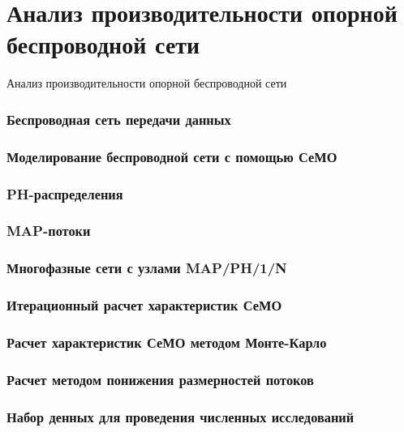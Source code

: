 \section{Анализ производительности опорной беспроводной сети}
\begin{frame}
    \begin{center}
        \Huge
        Анализ производительности опорной беспроводной сети
    \end{center}
\end{frame}

\begin{frame}
    \frametitle{Беспроводная сеть передачи данных}
\end{frame}

\begin{frame}
    \frametitle{Моделирование беспроводной сети с помощью СеМО}
\end{frame}

\begin{frame}
    \frametitle{PH-распределения}
\end{frame}

\begin{frame}
    \frametitle{MAP-потоки}
\end{frame}

\begin{frame}
    \frametitle{Многофазные сети с узлами MAP/PH/1/N}
\end{frame}

\begin{frame}
    \frametitle{Итерационный расчет характеристик СеМО}
\end{frame}

\begin{frame}
    \frametitle{Расчет характеристик СеМО методом Монте-Карло}
\end{frame}

\begin{frame}
    \frametitle{Расчет методом понижения размерностей потоков}
\end{frame}

\begin{frame}
    \frametitle{Набор денных для проведения численных исследований}
\end{frame}

